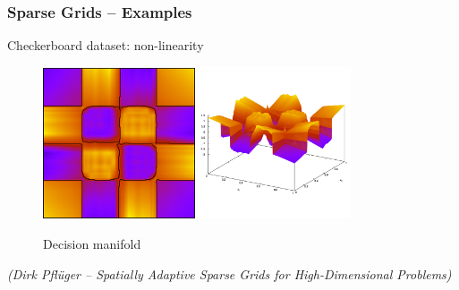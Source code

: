 \begin{frame}
  \frametitle{Sparse Grids -- Examples}
  \topline
  \vspace{-10px}
  \begin{block}{Checkerboard dataset: non-linearity}
    \begin{figure}[!htp]

      \centering
      \includegraphics[width=0.4\textwidth]{images/example_checker3}
      \hspace{10px}
      \includegraphics[width=0.4\textwidth]{images/example_checker4}
      \vspace{-8px}
      \caption{Decision manifold}
    \end{figure}
    \begin{flushright}
      \tiny{\emph{(Dirk Pflüger -- Spatially Adaptive Sparse Grids for
          High-Dimensional Problems)}}
    \end{flushright}
  \end{block}
\end{frame}


